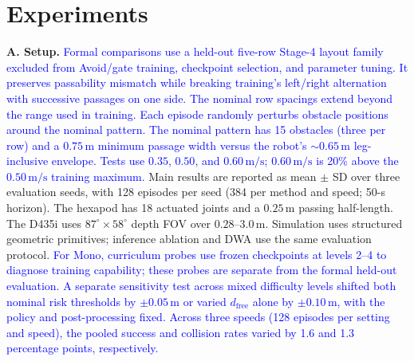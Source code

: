 \documentclass[letterpaper, 10 pt, conference]{ieeeconf}
\newcommand{\msec}{\,\mathrm{m/s}}
\newcommand{\rev}[1]{\textcolor{blue}{#1}}
\begin{document}
\section{Experiments}
\textbf{A. Setup.}
\rev{Formal comparisons use a held-out five-row Stage-4 layout family excluded from Avoid/gate training, checkpoint selection, and parameter tuning. It preserves passability mismatch while breaking training's left/right alternation with successive passages on one side. The nominal row spacings extend beyond the range used in training. Each episode randomly perturbs obstacle positions around the nominal pattern. The nominal pattern has 15 obstacles (three per row) and a $0.75\,\mathrm{m}$ minimum passage width versus the robot's $\sim0.65\,\mathrm{m}$ leg-inclusive envelope. Tests use $0.35$, $0.50$, and $0.60\msec$; $0.60\msec$ is 20\% above the $0.50\msec$ training maximum.}
Main results are reported as mean $\pm$ SD over three evaluation seeds, with 128 episodes per seed (384 per method and speed; 50-s horizon). The hexapod has 18 actuated joints and a $0.25\,\mathrm{m}$ passing half-length. The D435i uses $87^\circ\times58^\circ$ depth FOV over $0.28$--$3.0\,\mathrm{m}$. Simulation uses structured geometric primitives; inference ablation and DWA use the same evaluation protocol. \rev{For Mono, curriculum probes use frozen checkpoints at levels 2--4 to diagnose training capability; these probes are separate from the formal held-out evaluation.} \rev{A separate sensitivity test across mixed difficulty levels shifted both nominal risk thresholds by $\pm0.05\,\mathrm{m}$ or varied $d_{\mathrm{free}}$ alone by $\pm0.10\,\mathrm{m}$, with the policy and post-processing fixed. Across three speeds (128 episodes per setting and speed), the pooled success and collision rates varied by 1.6 and 1.3 percentage points, respectively.}
\end{document}
